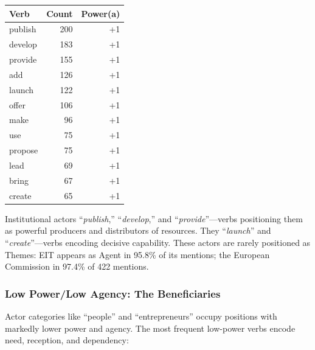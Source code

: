 \documentclass[../main.tex]{subfiles}
\begin{document}
\begin{center}
\small
\begin{tabular}{lrr}
\toprule
\textbf{Verb} & \textbf{Count} & \textbf{Power(a)} \\
\midrule
publish & 200 & +1 \\
develop & 183 & +1 \\
provide & 155 & +1 \\
add & 126 & +1 \\
launch & 122 & +1 \\
offer & 106 & +1 \\
make & 96 & +1 \\
use & 75 & +1 \\
propose & 75 & +1 \\
lead & 69 & +1 \\
bring & 67 & +1 \\
create & 65 & +1 \\
\bottomrule
\end{tabular}
\end{center}

Institutional actors ``\textit{publish},'' ``\textit{develop},'' and ``\textit{provide}''---verbs positioning them as powerful producers and distributors of resources. They ``\textit{launch}'' and ``\textit{create}''---verbs encoding decisive capability. These actors are rarely positioned as Themes: EIT appears as Agent in 95.8\% of its mentions; the European Commission in 97.4\% of 422 mentions.

\subsubsection{Low Power/Low Agency: The Beneficiaries}

Actor categories like ``people'' and ``entrepreneurs'' occupy positions with markedly lower power and agency. The most frequent low-power verbs encode need, reception, and dependency:
\end{document}
